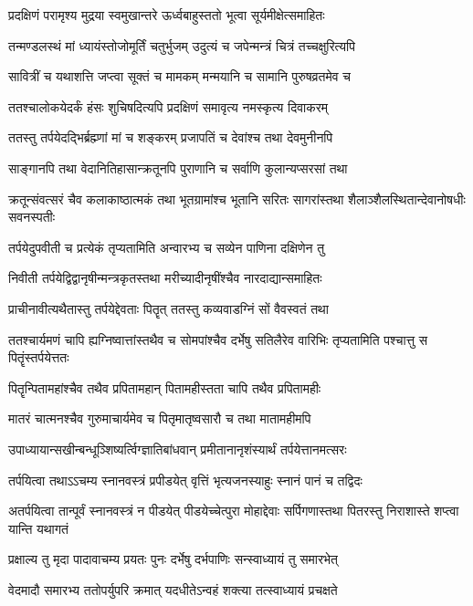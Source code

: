\twolineshloka
{प्रदक्षिणं परामृश्य मुद्रया स्वमुखान्तरे}
{ऊर्ध्वबाहुस्ततो भूत्वा सूर्यमीक्षेत्समाहितः}


\twolineshloka
{तन्मण्डलस्थं मां ध्यायंस्तोजोमूर्तिं चतुर्भुजम्}
{उदुत्यं च जपेन्मन्त्रं चित्रं तच्चक्षुरित्यपि}


\twolineshloka
{सावित्रीं च यथाशत्ति जप्त्वा सूक्तं च मामकम्}
{मन्मयानि च सामानि पुरुषव्रतमेव च}


\twolineshloka
{ततश्चालोकयेदर्कं हंसः शुचिषदित्यपि}
{प्रदक्षिणं समावृत्य नमस्कृत्य दिवाकरम्}


\twolineshloka
{ततस्तु तर्पयेदद्भिर्ब्रह्म्णां मां च शङ्करम्}
{प्रजापतिं च देवांश्च तथा देवमुनीनपि}


\twolineshloka
{साङ्गानपि तथा वेदानितिहासान्क्रतूनपि}
{पुराणानि च सर्वाणि कुलान्यप्सरसां तथा}


\threelineshloka
{क्रतून्संवत्सरं चैव कलाकाष्ठात्मकं तथा}
{भूतग्रामांश्च भूतानि सरितः सागरांस्तथा}
{शैलाञ्शैलस्थितान्देवानोषधीः सवनस्पतीः}


\twolineshloka
{तर्पयेदुपवीती च प्रत्येकं तृप्यतामिति}
{अन्वारभ्य च सव्येन पाणिना दक्षिणेन तु}


\twolineshloka
{निवीती तर्पयेद्विद्वानृषीन्मन्त्रकृतस्तथा}
{मरीच्यादीनृषींश्चैव नारदाद्यान्समाहितः}


\twolineshloka
{प्राचीनावीत्यथैतास्तु तर्पयेद्देवताः पितॄत्}
{ततस्तु कव्यवाडग्निं सों वैवस्वतं तथा}


\threelineshloka
{ततश्चार्यमणं चापि ह्यग्निष्वात्तांस्तथैव च}
{सोमपांश्चैव दर्भेषु सतिलैरेव वारिभिः}
{तृप्यतामिति पश्चात्तु स पितॄंस्तर्पयेत्ततः}


\twolineshloka
{पितॄन्पितामहांश्चैव तथैव प्रपितामहान्}
{पितामहीस्तता चापि तथैव प्रपितामहीः}


\twolineshloka
{मातरं चात्मनश्चैव गुरुमाचार्यमेव च}
{पितृमातृष्वसारौ च तथा मातामहीमपि}


\twolineshloka
{उपाध्यायान्सखीन्बन्धूञ्शिष्यर्त्विग्ज्ञातिबांधवान्}
{प्रमीतानानृशंस्यार्थं तर्पयेत्तानमत्सरः}


\twolineshloka
{तर्पयित्वा तथाऽऽचम्य स्नानवस्त्रं प्रपीडयेत्}
{वृत्तिं भृत्यजनस्याहुः स्नानं पानं च तद्विदः}


\threelineshloka
{अतर्पयित्वा तान्पूर्वं स्नानवस्त्रं न पीडयेत्}
{पीडयेच्चेत्पुरा मोहाद्देवाः सर्पिगणास्तथा}
{पितरस्तु निराशास्ते शप्त्वा यान्ति यथागतं}


\twolineshloka
{प्रक्षाल्य तु मृदा पादावाचम्य प्रयतः पुनः}
{दर्भेषु दर्भपाणिः सन्स्वाध्यायं तु समारभेत्}


\twolineshloka
{वेदमादौ समारभ्य ततोपर्युपरि क्रमात्}
{यदधीतेऽन्वहं शक्त्या तत्स्वाध्यायं प्रचक्षते}


